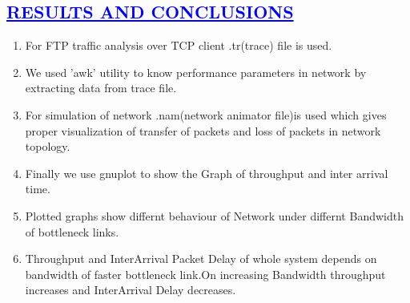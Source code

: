 \documentclass[a4paper,12pt]{report}
\begin{document}
\begin{center}
\chapter{\textcolor{blue}{\underline {RESULTS AND CONCLUSIONS}}}
\begin{enumerate}
\item For FTP traffic analysis over TCP client .tr(trace) file is used.
\item We used 'awk' utility to know performance parameters in network by extracting data from trace file.
\item For simulation of network .nam(network animator file)is used which gives proper visualization of transfer of packets and loss of packets in network topology. 
\item Finally we use gnuplot to show the Graph of throughput and inter arrival time.
\item  Plotted graphs show  differnt  behaviour of Network under differnt Bandwidth of bottleneck links.
\item Throughput and InterArrival Packet Delay of whole system depends on bandwidth of faster bottleneck link.On increasing Bandwidth throughput increases and InterArrival Delay decreases.

\end{enumerate}
\end{center}
\end{document}
